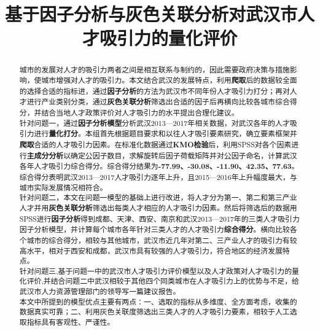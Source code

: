 \documentclass{whutmod}
\title{基于因子分析与灰色关联分析对武汉市人才吸引力的量化评价}
\begin{document}
	
	\begin{abstract}

城市的发展对人才的吸引力两者之间是相互联系与制约的，因此需要政府决策与措施影响，使城市增强对人才的吸引力。本文结合武汉的发展特点，利用\textbf{爬取}后的数据较全面的选择合适的指标进，通过\textbf{因子分析}的方法为武汉市不同年份人才吸引力打分；再对人才进行产业类别分类，通过\textbf{灰色关联分析}筛选出合适的因子后再横向比较各城市综合得分，并结合当地人才政策评价对人才吸引力的水平提出合理化建议。
~\\%

针对问题一，通过\textbf{因子分析模型}分析武汉2013—2017年相关数据，对武汉各年的人才吸引力进行\textbf{量化打分}。本组首先根据题目要求和以往人才吸引要素研究，确立要素框架并\textbf{爬取}合适的人才吸引力因素。在标准化数据通过\textbf{KMO检验}后，利用SPSS对各个因素进行\textbf{主成分分析}以确定公因子数目，求解旋转后因子荷载矩阵并对公因子命名，计算武汉各年人才吸引力综合得分。综合得分结果为\textbf{-77.99、-30.08、-11.90、42.35、77.63}。综合得分表明武汉2013—2017人才吸引力逐年上升，且2015—2016年上升幅度最大，与城市实际发展情况相符合。
~\\

针对问题二，本文在问题一模型的基础上进行改进，将人才分为第一、第二和第三产业人才并用\textbf{灰色关联分析}筛选出每类人才相应的人才吸引力因素。然后将筛选后的数据用SPSS进行\textbf{因子分析}得到成都、天津、西安、南京和武汉2013—2017年的三类人才吸引力因子分析模型，并计算每个城市各年针对三类人才的人才吸引力\textbf{综合得分}。横向比较各个城市的综合得分，相较与其他城市，武汉市近几年对第二、三产业人才的吸引力有较高水平，相对于西安和成都，武汉市具有较强的人才吸引力，符合地区的经济发展特点。
~\\

针对问题三,基于问题一中的武汉市人才吸引力评价模型以及人才政策对人才吸引力的量化评价,并结合问题二中武汉相较于其他四个同类城市在人才吸引力上的优势与不足，给武汉市人力资源管理部门的领导写一篇建议报告。
~\\

本文中所提到的模型优点主要有两点：一、选取的指标从多维度、全方面考虑，收集的数据真实可靠；二、利用灰色关联度筛选出三类人才的人才吸引力要素，相较于人工选取指标具有客观性、严谨性。
  
		
	\end{abstract}
	
\end{document}

